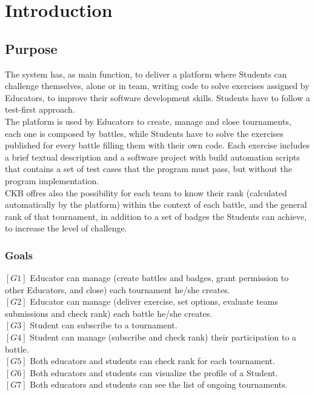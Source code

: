 \section{Introduction}

\vspace{24pt}

\subsection{Purpose}
The system has, as main function, to deliver a platform where Students can challenge themselves, alone or in team, writing code to solve exercises assigned by Educators, to improve their software development skills. Students have to follow a test-first approach.
\\The platform is used by Educators to create, manage and close tournaments, each one is composed by battles, while Students have to solve the exercises published for every battle filling them with their own code. Each exercise includes a brief textual description and a software project with build automation scripts that contains a set of test cases that the program must pass, but without the program implementation.
\\CKB offres also the possibility for each team to know their rank (calculated automatically by the platform) within the context of each battle, and the general rank of that tournament, in addition to a set of badges the Students can achieve, to increase the level of challenge. 

\vspace{24pt}

\subsubsection{Goals}
$[G1]$ Educator can manage (create battles and badges, grant permission to other Educators, and close) each tournament he/she creates. 
\\$[G2]$ Educator can manage (deliver exercise, set options, evaluate teams submissions and check rank) each battle he/she creates.
\\$[G3]$ Student can subscribe to a tournament.
\\$[G4]$ Student can manage (subscribe and check rank) their participation to a battle.
\\$[G5]$ Both educators and students can check rank for each tournament.
\\$[G6]$ Both educators and students can visualize the profile of a Student.
\\$[G7]$ Both educators and students can see the list of ongoing tournaments.



